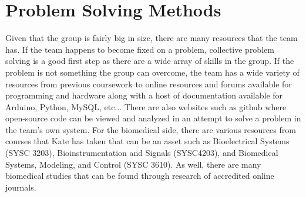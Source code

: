 \section{Problem Solving Methods}
Given that the group is fairly big in size, there are many resources that the team has. If the team happens to become fixed on a problem, collective problem solving is a good first step as there are a wide array of skills in the group. If the problem is not something the group can overcome, the team has a wide variety of resources from previous coursework to online resources and forums available for programming and hardware along with a host of documentation available for Arduino, Python, MySQL, etc... There are also websites such as github where open-source code can be viewed and analyzed in an attempt to solve a problem in the team’s own system. For the biomedical side, there are various resources from courses that Kate has taken that can be an asset such as Bioelectrical Systems (SYSC 3203), Bioinstrumentation and Signals (SYSC4203), and Biomedical Systems, Modeling, and Control (SYSC 3610). As well, there are many biomedical studies that can be found through research of accredited online journals. 